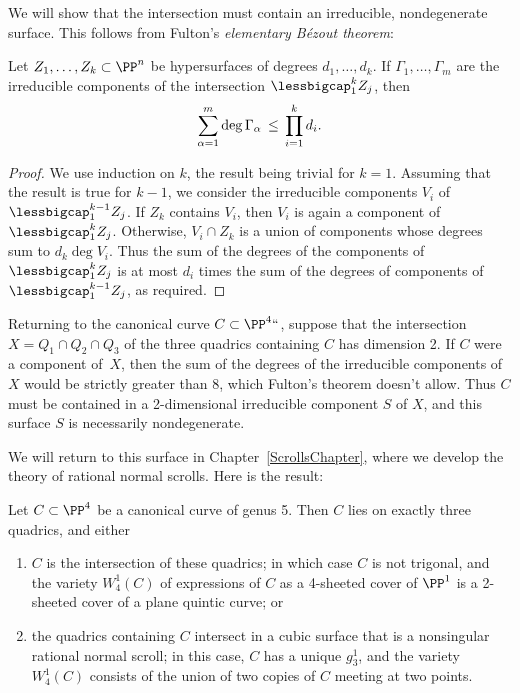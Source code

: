 We will show that the intersection must contain an irreducible,
nondegenerate surface. This  follows from
Fulton's
{\it elementary B\'ezout theorem}:
%
%
%
%

\begin{npt}
\begin{theorem}
\label{Fulton Bezout}
Let $Z_1,\dots, Z_k \subset \PP^n$ be hypersurfaces of degrees $d_1,\dots,d_k$. If $\Gamma_1,\dots,\Gamma_m$ are the irreducible components of the intersection $\lessbigcap_1^kZ_j$, then
$$
\let\;\,
\sum_{\alpha = 1}^m \deg \Gamma_\alpha \; \leq \; \prod_{i=1}^k d_i.
$$
\end{theorem}
\end{npt}

\begin{proof}
We
use
induction on $k$, the result being trivial for $k=1$. Assuming that the result
is true for $k-1$, we consider the irreducible components $V_i$ of $\lessbigcap_1^{k-1}Z_j$. If $Z_k$ contains
$V_i$, then $V_i$ is again a component of $\lessbigcap_1^kZ_j$. Otherwise,
$V_i\cap Z_k$ is a union of components whose degrees sum to $d_k\deg V_i$. Thus
the sum of the degrees of the components of $\lessbigcap_1^kZ_j$ is at most $d_i$ times the
sum of the degrees of components of $\lessbigcap_1^{k-1}Z_j$, as required.
\meshing
\end{proof}

Returning to the canonical curve $C \subset \PP^4` `$, suppose that
the intersection $X = Q_1 \cap Q_2 \cap Q_3$ of the three quadrics
containing $C$ has dimension 2. If $C$ were a component of~$X$, then
the sum of the degrees of the irreducible components of $X$ would be
strictly greater than 8, which Fulton's theorem doesn't allow. Thus
$C$ must be contained in a 2-dimensional irreducible component  $S$ of
$X$, and this surface $S$ is necessarily nondegenerate.

We will return to this surface in Chapter~\ref{ScrollsChapter},
where we develop the theory of rational normal scrolls.
Here is the result:

\begin{theorem}
Let $C \subset \PP^4$ be a canonical curve of genus 5.
%
%
Then $C$ lies on exactly three quadrics, and either
\begin{enumerate}
\item $C$ is the intersection of these quadrics; in which case $C$ is
  not trigonal, and the variety $W^1_4(C)$ of expressions of $C$ as a
  4-sheeted cover of $\PP^1$ is a 2-sheeted cover of a plane quintic
  curve; or
\item the quadrics containing $C$ intersect in a cubic surface that is
a nonsingular rational normal scroll; in this case, $C$ has a unique
$g^1_3$, and the variety
$W^1_4(C)$
%
consists of the union of two
copies of $C$ meeting at two points.
\unif
\end{enumerate}
\end{theorem}

